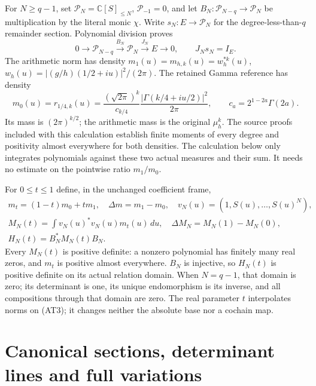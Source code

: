 \documentclass[11pt]{article}
\newcommand{\C}{\mathbb C}
\newcommand{\cP}{\mathcal P}
\begin{document}
For $N\ge q-1$, set $\cP_N=\C[S]_{\le N}$,
$\cP_{-1}=0$, and let
$B_N:\cP_{N-q}\to\cP_N$ be multiplication by the literal monic
$\chi$. Write $s_N:E\to\cP_N$ for the degree-less-than-$q$
remainder section. Polynomial division proves
\[
 0\longrightarrow\cP_{N-q}\xrightarrow{B_N}\cP_N
       \xrightarrow{J_N}E\longrightarrow0,
 \qquad J_Ns_N=I_E.                         \tag{AT3}
\]
The arithmetic norm has density
$m_1(u)=m_{h,k}(u)=w_h^{*k}(u)$,
$w_h(u)=|(g/h)(1/2+iu)|^2/(2\pi)$.
The retained Gamma reference has density
\[
 m_0(u)=r_{1/4,k}(u)
 =\frac{(\sqrt{2\pi})^k}{c_{k/4}}
       \frac{|\Gamma(k/4+iu/2)|^2}{2\pi},
 \qquad c_a=2^{1-2a}\Gamma(2a).              \tag{AT4}
\]
Its mass is $(2\pi)^{k/2}$; the arithmetic mass is the original
$\mu_h^k$. The source proofs included with this calculation establish
finite moments of every degree and positivity almost everywhere for
both densities. The calculation below only integrates polynomials
against these two actual measures and their sum. It needs no estimate
on the pointwise ratio $m_1/m_0$.

For $0\le t\le1$ define, in the unchanged coefficient frame,
\[
 \begin{gathered}
 m_t=(1-t)m_0+tm_1,\quad \Delta m=m_1-m_0,
 \quad v_N(u)=(1,S(u),\ldots,S(u)^N),\\
 M_N(t)=\int v_N(u)^*v_N(u)m_t(u)\,du,
 \quad \Delta M_N=M_N(1)-M_N(0),\\
 H_N(t)=B_N^*M_N(t)B_N.                     \tag{AT5}
 \end{gathered}
\]
Every $M_N(t)$ is positive definite: a nonzero polynomial has finitely
many real zeros, and $m_t$ is positive almost everywhere. $B_N$ is
injective, so $H_N(t)$ is positive definite on its actual relation
domain. When $N=q-1$, that domain is zero; its determinant is one,
its unique endomorphism is its inverse, and all compositions through
that domain are zero. The real parameter $t$ interpolates norms on
(AT3); it changes neither the absolute base nor a cochain map.

\section{Canonical sections, determinant lines and full variations}
\end{document}
